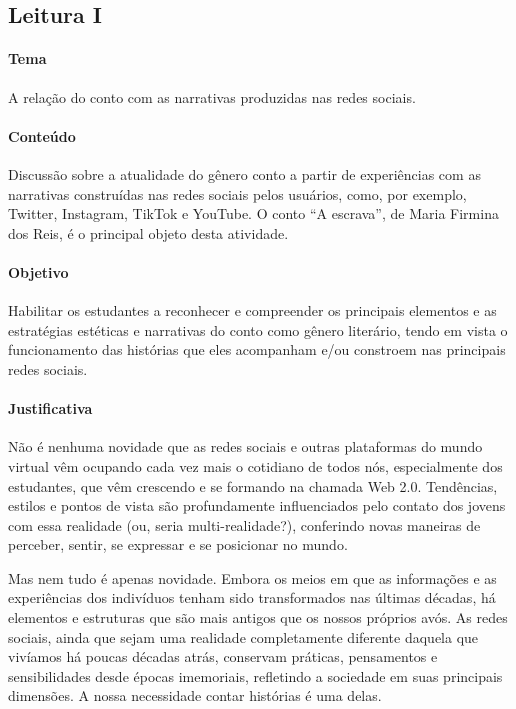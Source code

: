 \documentclass[12pt]{extarticle}
\begin{document}
\subsection{Leitura I}

\paragraph{Tema} A relação do conto com as narrativas produzidas nas redes sociais. 


\paragraph{Conteúdo} Discussão sobre a atualidade do gênero conto a partir
de experiências com as narrativas construídas nas redes sociais pelos
usuários, como, por exemplo, Twitter, Instagram, TikTok e YouTube. O
conto ``A escrava'', de Maria Firmina dos Reis, é o principal objeto
desta atividade.

\paragraph{Objetivo} Habilitar os estudantes a reconhecer e compreender os
principais elementos e as estratégias estéticas e narrativas do conto
como gênero literário, tendo em vista o funcionamento das histórias que
eles acompanham e/ou constroem nas principais redes sociais.

\paragraph{Justificativa} Não é nenhuma novidade que as redes sociais e
outras plataformas do mundo virtual vêm ocupando cada vez mais o
cotidiano de todos nós, especialmente dos estudantes, que vêm crescendo
e se formando na chamada Web 2.0. Tendências, estilos e pontos de vista
são profundamente influenciados pelo contato dos jovens com essa
realidade (ou, seria multi-realidade?), conferindo novas maneiras de
perceber, sentir, se expressar e se posicionar no mundo.

Mas nem tudo é apenas novidade. Embora os meios em que as informações e
as experiências dos indivíduos tenham sido transformados nas últimas
décadas, há elementos e estruturas que são mais antigos que os nossos
próprios avós. As redes sociais, ainda que sejam uma realidade
completamente diferente daquela que vivíamos há poucas décadas atrás,
conservam práticas, pensamentos e sensibilidades desde épocas
imemoriais, refletindo a sociedade em suas principais dimensões. A nossa
necessidade contar histórias é uma delas.
\end{document}
